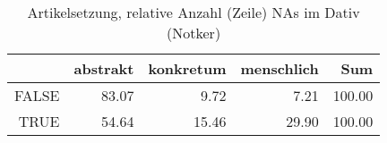 \begin{table}[ht]
\centering
\begin{tabular}{rrrrr}
  \hline
 & abstrakt & konkretum & menschlich & Sum \\ 
  \hline
FALSE & 83.07 & 9.72 & 7.21 & 100.00 \\ 
  TRUE & 54.64 & 15.46 & 29.90 & 100.00 \\ 
   \hline
\end{tabular}
\caption{Artikelsetzung, relative Anzahl (Zeile) NAs im Dativ (Notker)} 
\end{table}
